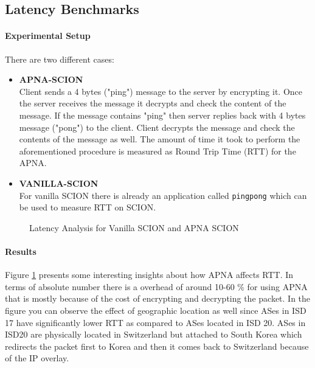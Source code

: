 \subsection{Latency Benchmarks}
\paragraph{Experimental Setup}
There are two different cases:
\begin{itemize}
    \item \textbf{APNA-SCION }\\ Client sends a 4 bytes ("ping") message to the server by encrypting it. Once the server receives the message it decrypts and check the content of the message. If the message contains "ping" then server replies back with 4 bytes message ("pong") to the client. Client decrypts the message and check the contents of the message as well. The amount of time it took to perform the aforementioned procedure is measured as Round Trip Time (RTT) for the APNA.
    \item \textbf{VANILLA-SCION} \\ For vanilla SCION there is already an application called \texttt{pingpong} which can be used to measure RTT on SCION. 
\end{itemize}

\begin{figure}[th!!]
\centering
\noindent
{}
\decoRule
\caption[Latency Analysis]{Latency Analysis for Vanilla SCION and APNA SCION}
\label{fig:perf_latency}
\end{figure}

\paragraph{Results}
Figure \ref{fig:perf_latency} presents some interesting insights about how APNA affects RTT. In terms of absolute number there is a overhead of around 10-60 \% for using APNA that is mostly because of the cost of encrypting and decrypting the packet. In the figure you can observe the effect of geographic location as well since ASes in ISD 17 have significantly lower RTT as compared to ASes located in ISD 20. ASes in ISD20 are physically located in Switzerland but attached to South Korea which redirects the packet first to Korea and then it comes back to Switzerland because of the IP overlay.

